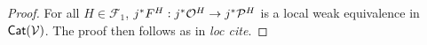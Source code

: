 \documentclass[a4paper,10pt
,draft
]{article}%
\renewcommand{\F}{\mathcal F}
\newcommand{\J}{\mathbb J}
\renewcommand{\1}{\eta}%
\begin{document}
\begin{proof}
      For all $H \in \F_1$,
      $j^{\**}F^H: j^{\**}\O^H \to j^{\**}\P^H$ is a local weak equivalence in $\mathsf{Cat}(\mathcal V)$.
      The proof then follows as in \textit{loc cite}.
\end{proof}
\end{document}
